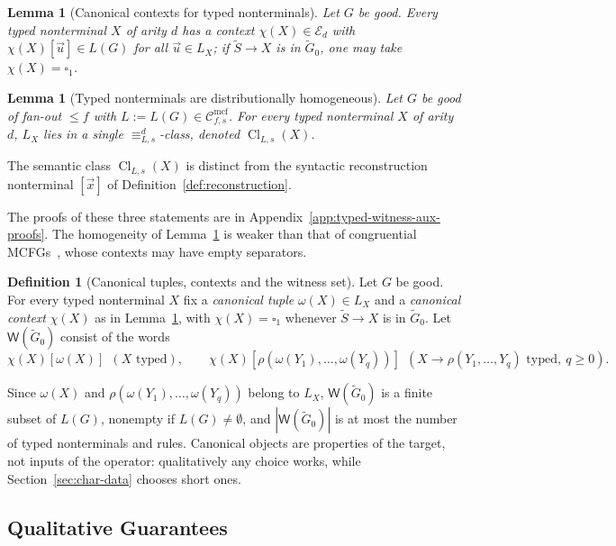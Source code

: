 \documentclass[11pt]{article}
\numberwithin{equation}{section}
\theoremstyle{plain}
\newtheorem{lemma}[theorem]{Lemma}
\theoremstyle{definition}
\newtheorem{definition}[theorem]{Definition}
\theoremstyle{remark}
\newcommand{\Wit}{\mathsf{W}}
\newcommand{\Cmcf}[2]{\mathcal{C}^{\mathrm{mcf}}_{#1,#2}}
\newcommand{\tuple}[1]{\vec{#1}}
\newcommand{\blank}{\square}
\theoremstyle{plain}
\begin{document}
\begin{lemma}[Canonical contexts for typed nonterminals]
\label{lem:identity-canonical-contexts}
Let $G$ be good.  Every typed nonterminal $X$ of arity $d$ has a context
$\chi(X)\in\mathcal E_d$ with $\chi(X)[\tuple u]\in L(G)$ for all
$\tuple u\in L_X$; if $\widetilde S\to X$ is in $\widetilde G_0$, one may take
$\chi(X)=\blank_1$.
\end{lemma}

\begin{lemma}[Typed nonterminals are distributionally homogeneous]
\label{lem:typed-homogeneity}
Let $G$ be good of fan-out $\le f$ with $L:=L(G)\in\Cmcf{f}{s}$.  For every typed nonterminal $X$
of arity $d$, $L_X$ lies in a single $\equiv_{L,s}^d$-class, denoted
$\operatorname{Cl}_{L,s}(X)$.
\end{lemma}

The semantic class $\operatorname{Cl}_{L,s}(X)$ is distinct from the syntactic
reconstruction nonterminal $[\tuple x]$ of Definition~\ref{def:reconstruction}.

The proofs of these three statements are in
Appendix~\ref{app:typed-witness-aux-proofs}.  The homogeneity of
Lemma~\ref{lem:typed-homogeneity} is weaker than that of congruential
MCFGs~\cite{ClarkYoshinaka2016}, whose contexts may have empty separators.

\begin{definition}[Canonical tuples, contexts and the witness set]
\label{def:target-canonical}
\label{def:witness-set}
Let $G$ be good.  For every typed nonterminal $X$ fix a \emph{canonical tuple}
$\omega(X)\in L_X$ and a \emph{canonical context} $\chi(X)$ as in
Lemma~\ref{lem:identity-canonical-contexts}, with $\chi(X)=\blank_1$ whenever
$\widetilde S\to X$ is in $\widetilde G_0$.  Let $\Wit(\widetilde G_0)$
consist of the words
\[
 \chi(X)[\omega(X)]\ \ (X\text{ typed}),\qquad
 \chi(X)[\rho(\omega(Y_1),\ldots,\omega(Y_q))]\ \
 (X\to\rho(Y_1,\ldots,Y_q)\text{ typed},\ q\ge0).
\]
\end{definition}

Since $\omega(X)$ and $\rho(\omega(Y_1),\ldots,\omega(Y_q))$ belong to $L_X$,
$\Wit(\widetilde G_0)$ is a finite subset of $L(G)$, nonempty if
$L(G)\ne\emptyset$, and $|\Wit(\widetilde G_0)|$ is at most the number of
typed nonterminals and rules.  Canonical objects are properties of the
target, not inputs of the operator: qualitatively any choice works, while
Section~\ref{sec:char-data} chooses short ones.

\subsection{Qualitative Guarantees}\label{sec:soundness}
\label{sec:completeness}
\label{sec:poly-time}
\end{document}
